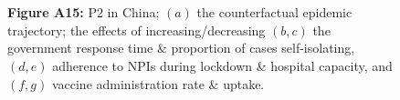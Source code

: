 \documentclass[paper=a4,fontsize=11pt]{article}
\begin{document}
\begin{figure}[!h]
  \\
  \hspace{1.76cm}
  \\
  \caption*{\textbf{Figure A15:} P2 in China; $(a)$ the counterfactual epidemic trajectory; the effects of increasing/decreasing $(b,c)$ the government response time \& proportion of cases self-isolating, $(d,e)$ adherence to NPIs during lockdown \& hospital capacity, and $(f,g)$ vaccine administration rate \& uptake.}
\end{figure}
\end{document}

